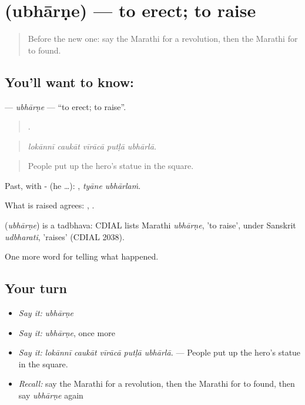 \section[\texorpdfstring{\mr{उभारणे} (ubhārṇe)}{उभारणे (ubhārṇe)}]{ (ubhārṇe) — to erect; to raise}

\label{lesson:MR-C334-ubharne}



\begin{quote}
Before the new one: say the Marathi for a revolution, then the Marathi for to found.
\end{quote}

\subsection*{You'll want to know: }
\textbf{} — \emph{ubhārṇe} — \textquotedblleft{}to erect; to raise\textquotedblright{}.

\begin{quote}
    .
\end{quote}

\begin{quote}
\emph{lokānnī caukāt vīrācā putḷā ubhārlā.}
\end{quote}

\begin{quote}
People put up the hero's statue in the square.
\end{quote}

Past, with - (he …):  , \emph{tyāne ubhārlaṁ}.

What is raised agrees:  ,  .

\begin{cousinweb}
\textbf{} (\emph{ubhārṇe}) is a tadbhava: CDIAL lists Marathi \emph{ubhārṇe}, 'to raise', under Sanskrit \emph{udbharati}, 'raises' (CDIAL 2038).
\end{cousinweb}

\begin{grammarlens}[title={What you've built}]
One more word for telling what happened.
\end{grammarlens}

\subsection*{Your turn}
\begin{itemize}
\raggedright
  \item \emph{Say it:} \emph{ubhārṇe}
  \item \emph{Say it:} \emph{ubhārṇe}, once more
  \item \emph{Say it:} \emph{lokānnī caukāt vīrācā putḷā ubhārlā.} — People put up the hero's statue in the square.
  \item \emph{Recall:} say the Marathi for a revolution, then the Marathi for to found, then say \emph{ubhārṇe} again
\end{itemize}

